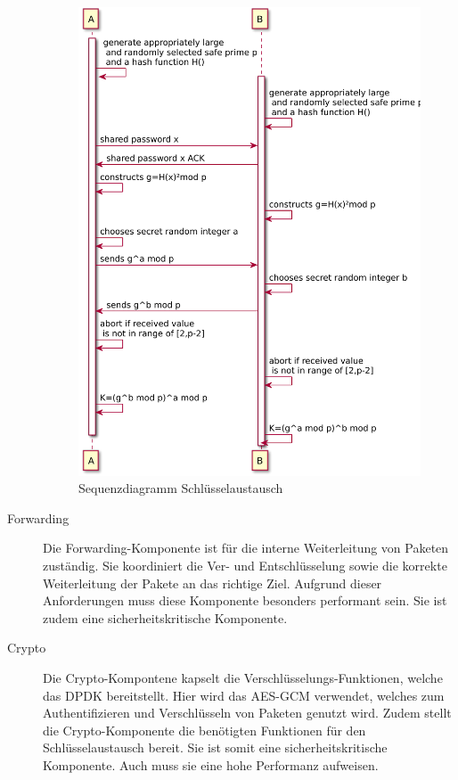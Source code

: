 \documentclass[a4paper, 11pt, ngerman, fleqn]{article}
\begin{document}
\begin{description}
	\begin{figure}
		\begin{center}
			\includegraphics[width = 14cm]{figures/SPEKE.pdf}
			\caption{Sequenzdiagramm Schlüsselaustausch}
		\end{center}
	\end{figure}
	
	\item[Forwarding]
	Die Forwarding-Komponente ist für die interne Weiterleitung von Paketen zuständig.
	Sie koordiniert die Ver- und Entschlüsselung sowie die korrekte Weiterleitung der Pakete an das richtige Ziel.
	Aufgrund dieser Anforderungen muss diese Komponente besonders performant sein.
	Sie ist zudem eine sicherheitskritische Komponente.
	
	\item[Crypto]
	Die Crypto-Kompontene kapselt die Verschlüsselungs-Funktionen, welche das DPDK bereitstellt. 
	Hier wird das AES-GCM verwendet, welches zum Authentifizieren und Verschlüsseln von Paketen genutzt wird. 
	Zudem stellt die Crypto-Komponente die benötigten Funktionen für den Schlüsselaustausch bereit. 
	Sie ist somit eine sicherheitskritische Komponente. 
	Auch muss sie eine hohe Performanz aufweisen.
	
\end{description}
\end{document}
